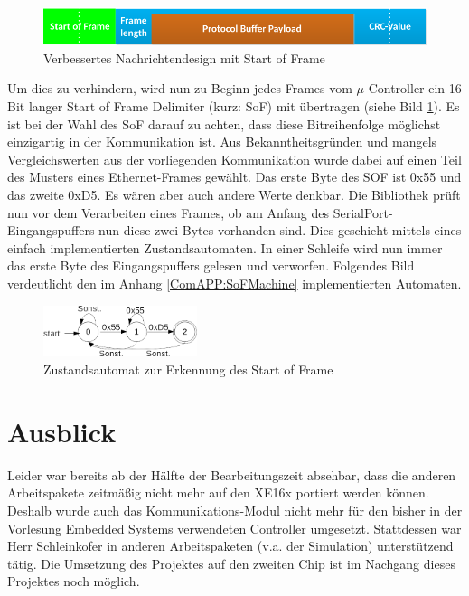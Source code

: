 \paragraph{}
\begin{figure}
  \includegraphics[width=\textwidth]{MessageFormat_enhanced}
  \caption{Verbessertes Nachrichtendesign mit Start of Frame}
  \label{fig:FrameEnhanced}
\end{figure}
Um dies zu verhindern, wird nun zu Beginn jedes Frames vom $\mu$-Controller ein 16 Bit langer Start of Frame Delimiter (kurz: SoF) mit übertragen (siehe Bild \ref{fig:FrameEnhanced}). Es ist bei der Wahl des SoF darauf zu achten, dass diese Bitreihenfolge möglichst einzigartig in der Kommunikation ist. Aus Bekanntheitsgründen und mangels Vergleichswerten aus der vorliegenden Kommunikation wurde dabei auf einen Teil des Musters eines Ethernet-Frames gewählt. Das erste Byte des SOF ist 0x55 und das zweite 0xD5. Es wären aber auch andere Werte denkbar. Die Bibliothek prüft nun vor dem Verarbeiten eines Frames, ob am Anfang des SerialPort-Eingangspuffers nun diese zwei Bytes vorhanden sind. Dies geschieht mittels eines einfach implementierten Zustandsautomaten. In einer Schleife wird nun immer das erste Byte des Eingangspuffers gelesen und verworfen. Folgendes Bild verdeutlicht den im Anhang \ref{ComAPP:SoFMachine} implementierten Automaten.
\begin{figure}
  \centering
  \includegraphics[width=0.4\textwidth]{Automat}
  \caption{Zustandsautomat zur Erkennung des Start of Frame}
  \label{fig:Machine}
\end{figure}
\section{Ausblick}
Leider war bereits ab der Hälfte der Bearbeitungszeit absehbar, dass die anderen Arbeitspakete zeitmäßig nicht mehr auf den XE16x portiert werden können. Deshalb wurde auch das Kommunikations-Modul nicht mehr für den bisher in der Vorlesung Embedded Systems verwendeten Controller umgesetzt. Stattdessen war Herr Schleinkofer in anderen Arbeitspaketen (v.a. der Simulation) unterstützend tätig. Die Umsetzung des Projektes auf den zweiten Chip ist im Nachgang dieses Projektes noch möglich.
